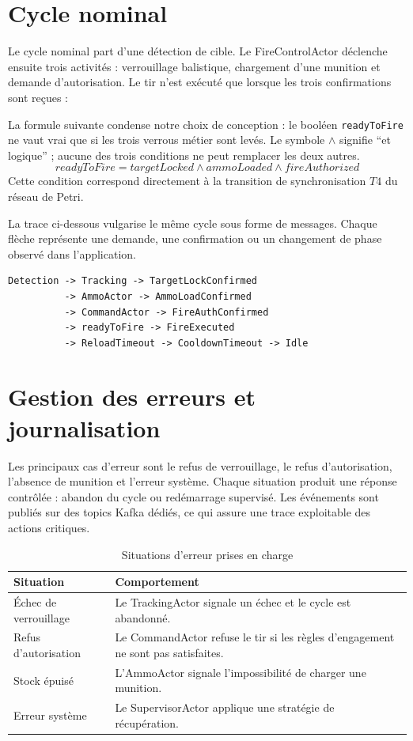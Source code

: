 \documentclass[11pt,a4paper]{report}
\begin{document}
\section{Cycle nominal}
Le cycle nominal part d'une détection de cible. Le FireControlActor déclenche ensuite trois activités : verrouillage balistique, chargement d'une munition et demande d'autorisation. Le tir n'est exécuté que lorsque les trois confirmations sont reçues :

La formule suivante condense notre choix de conception : le booléen \texttt{readyToFire} ne vaut vrai que si les trois verrous métier sont levés. Le symbole $\land$ signifie ``et logique'' ; aucune des trois conditions ne peut remplacer les deux autres.
\[
readyToFire = targetLocked \land ammoLoaded \land fireAuthorized
\]
Cette condition correspond directement à la transition de synchronisation $T4$ du réseau de Petri.

La trace ci-dessous vulgarise le même cycle sous forme de messages. Chaque flèche représente une demande, une confirmation ou un changement de phase observé dans l'application.

\begin{lstlisting}
Detection -> Tracking -> TargetLockConfirmed
          -> AmmoActor -> AmmoLoadConfirmed
          -> CommandActor -> FireAuthConfirmed
          -> readyToFire -> FireExecuted
          -> ReloadTimeout -> CooldownTimeout -> Idle
\end{lstlisting}

\section{Gestion des erreurs et journalisation}
Les principaux cas d'erreur sont le refus de verrouillage, le refus d'autorisation, l'absence de munition et l'erreur système. Chaque situation produit une réponse contrôlée : abandon du cycle ou redémarrage supervisé. Les événements sont publiés sur des topics Kafka dédiés, ce qui assure une trace exploitable des actions critiques.

\begin{table}[H]
\centering
\caption{Situations d'erreur prises en charge}
\begin{tabularx}{\textwidth}{lY}
\toprule
Situation & Comportement \\
\midrule
Échec de verrouillage & Le TrackingActor signale un échec et le cycle est abandonné. \\
Refus d'autorisation & Le CommandActor refuse le tir si les règles d'engagement ne sont pas satisfaites. \\
Stock épuisé & L'AmmoActor signale l'impossibilité de charger une munition. \\
Erreur système & Le SupervisorActor applique une stratégie de récupération. \\
\bottomrule
\end{tabularx}
\end{table}
\end{document}
